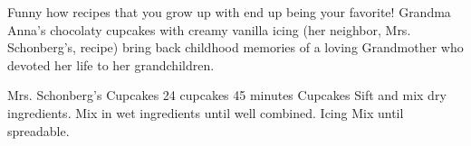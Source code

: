 Funny how recipes that you grow up with end up being your favorite! Grandma
Anna's chocolaty cupcakes with creamy vanilla icing (her neighbor, Mrs.
Schonberg's, recipe) bring back childhood memories of a loving Grandmother who
devoted her life to her grandchildren.

\begin{recipe}{Mrs. Schonberg's Cupcakes} {24 cupcakes} {45 minutes}
\freeform Cupcakes
Sift and mix dry ingredients.
Mix in wet ingredients until well combined.
\freeform {}
\freeform Icing
Mix until spreadable.

\end{recipe}

